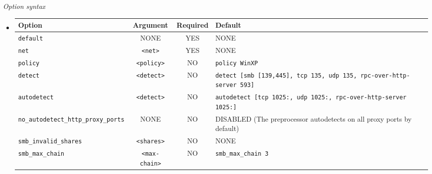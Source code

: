 \documentclass[english]{report}
\begin{document}
\textit{Option syntax}
\begin{itemize}
\item[]
\begin{tabular}{|l|c|c|p{6cm}|}

\hline
Option & Argument & Required & Default\\
\hline

\hline
\texttt{default} & NONE              & YES & NONE\\

\hline
\texttt{net}     & \texttt{<net>}    & YES & NONE\\

\hline
\texttt{policy}  & \texttt{<policy>} &  NO & \texttt{policy WinXP}\\

\hline
\texttt{detect}  & \texttt{<detect>} &  NO & \texttt{detect [smb [139,445], tcp
135, udp 135, rpc-over-http-server 593]}\\

\hline
\texttt{autodetect} & \texttt{<detect>} & NO & \texttt{autodetect [tcp
1025:, udp 1025:, rpc-over-http-server 1025:]}\\

\hline
\texttt{no\_autodetect\_http\_proxy\_ports} & NONE & NO & DISABLED (The
preprocessor autodetects on all proxy ports by default)\\

\hline
\texttt{smb\_invalid\_shares} & \texttt{<shares>} & NO & NONE\\

\hline
\texttt{smb\_max\_chain} & \texttt{<max-chain>} & NO & \texttt{smb\_max\_chain
3}\\

\hline
\end{tabular}
\end{itemize}
\end{document}
